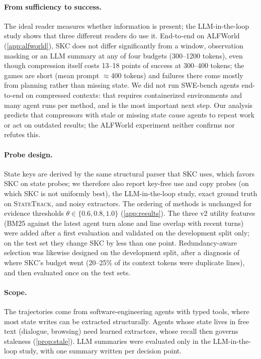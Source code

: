 \paragraph{From sufficiency to success.} The ideal reader measures whether
information is present; the LLM-in-the-loop study shows that three different
readers do use it. End-to-end on ALFWorld (\cref{app:alfworld}), SKC does not
differ significantly from a window, observation masking or an LLM summary at
any of four budgets (300--1200 tokens), even though compression itself costs
13--18 points of success at 300--400 tokens; the games are short
(mean prompt $\approx$400 tokens) and failures there come mostly from planning
rather than missing state. We did not run SWE-bench agents end-to-end on
compressed contexts: that requires containerized environments and many agent
runs per method, and is the most important next step. Our analysis predicts
that compressors with stale or missing state cause agents to repeat work or act
on outdated results; the ALFWorld experiment neither confirms nor refutes this.

\paragraph{Probe design.} State keys are derived by the same structural parser
that SKC uses, which favors SKC on state probes; we therefore also report
key-free use and copy probes (on which SKC is not uniformly best), the
LLM-in-the-loop study, exact ground truth on \textsc{StateTrack}, and noisy
extractors. The ordering of methods is unchanged for evidence thresholds
$\theta\in\{0.6,0.8,1.0\}$ (\cref{app:results}). The three v2 utility features
(BM25 against the latest agent turn alone and line overlap with recent turns)
were added after a first evaluation and validated on the development split only;
on the test set they change SKC by less than one point. Redundancy-aware
selection was likewise designed on the development split, after a diagnosis of
where SKC's budget went (20--25\% of its context tokens were duplicate lines),
and then evaluated once on the test sets.

\paragraph{Scope.} The trajectories come from software-engineering agents with
typed tools, where most state writes can be extracted structurally. Agents whose
state lives in free text (dialogue, browsing) need learned extractors, whose
recall then governs staleness (\cref{prop:stale}). LLM summaries were evaluated
only in the LLM-in-the-loop study, with one summary written per decision point.

